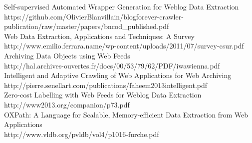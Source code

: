 Self-supervised Automated Wrapper Generation for Weblog Data Extraction\\
https://github.com/OlivierBlanvillain/blogforever-crawler-publication/raw/master/papers/bncod\_published.pdf\\

Web Data Extraction, Applications and Techniques: A Survey\\
http://www.emilio.ferrara.name/wp-content/uploads/2011/07/survey-csur.pdf\\

Archiving Data Objects using Web Feeds\\
http://hal.archives-ouvertes.fr/docs/00/53/79/62/PDF/iwawienna.pdf\\

Intelligent and Adaptive Crawling of Web Applications for Web Archiving\\
http://pierre.senellart.com/publications/faheem2013intelligent.pdf\\

Zero-cost Labelling with Web Feeds for Weblog Data Extraction\\
http://www2013.org/companion/p73.pdf\\

OXPath: A Language for Scalable, Memory-efficient Data Extraction from Web Applications\\
http://www.vldb.org/pvldb/vol4/p1016-furche.pdf\\
